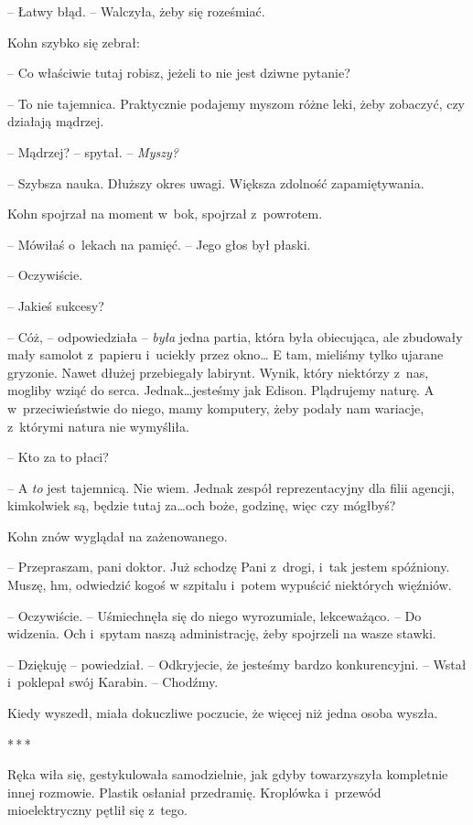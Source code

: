 \documentclass[oneside,polish,11pt,sfheadings]{mwbk}
\newcommand{\threeast}{\bigskip\par\centerline{*\,*\,*}\medskip\par}%
\begin{document}
-- Łatwy błąd. -- Walczyła, żeby się roześmiać.

Kohn szybko się zebrał: 

-- Co właściwie tutaj robisz, jeżeli to nie jest
dziwne pytanie?

-- To nie tajemnica. Praktycznie podajemy myszom różne leki, żeby
zobaczyć, czy działają mądrzej.

-- Mądrzej? -- spytał. -- \emph{Myszy?}

-- Szybsza nauka. Dłuższy okres uwagi. Większa zdolność zapamiętywania.

Kohn spojrzał na moment w~bok, spojrzał z~powrotem. 

-- Mówiłaś o~lekach
na pamięć. -- Jego głos był płaski.

-- Oczywiście.

-- Jakieś sukcesy?

-- Cóż, -- odpowiedziała -- \emph{była} jedna partia, która była
obiecująca, ale zbudowały mały samolot z~papieru i~uciekły przez okno\ldots
E tam, mieliśmy tylko ujarane gryzonie. Nawet dłużej przebiegały
labirynt. Wynik, który niektórzy z~nas, mogliby wziąć do serca.
Jednak\ldots jesteśmy jak Edison. Plądrujemy naturę. A w~przeciwieństwie do
niego, mamy komputery, żeby podały nam wariacje, z~którymi natura nie
wymyśliła.

-- Kto za to płaci?

-- A \emph{to} jest tajemnicą. Nie wiem. Jednak zespół reprezentacyjny
dla filii agencji, kimkolwiek są, będzie tutaj za\ldots och boże, godzinę,
więc czy mógłbyś?

Kohn znów wyglądał na zażenowanego. 

-- Przepraszam, pani doktor. Już
schodzę Pani z~drogi, i~tak jestem spóźniony. Muszę, hm, odwiedzić kogoś
w szpitalu i~potem wypuścić niektórych więźniów.

-- Oczywiście. -- Uśmiechnęła się do niego wyrozumiale, lekceważąco. -- Do
widzenia. Och i~spytam naszą administrację, żeby spojrzeli na wasze
stawki.

-- Dziękuję -- powiedział. -- Odkryjecie, że jesteśmy bardzo konkurencyjni.
-- Wstał i~poklepał swój Karabin. -- Chodźmy.

Kiedy wyszedł, miała dokuczliwe poczucie, że więcej niż jedna osoba
wyszła.

\threeast 

Ręka wiła się, gestykulowała samodzielnie, jak gdyby towarzyszyła
kompletnie innej rozmowie. Plastik osłaniał przedramię. Kroplówka i~przewód mioelektryczny pętlił się z~tego.
\end{document}
